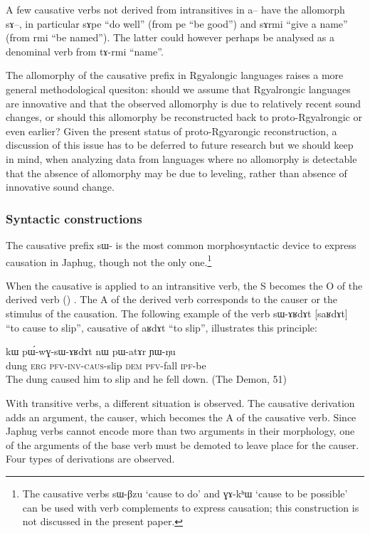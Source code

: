 \documentclass[oldfontcommands,oneside,a4paper,11pt]{article}
\newcommand{\ipa}[1]{{\phon \mbox{#1}}} %
\newcommand{\pfv}{\textsc{pfv}}
\newcommand{\caus}{\textsc{caus}}
\newcommand{\dem}{\textsc{dem}}
\newcommand{\erg}{\textsc{erg}}
\newcommand{\inv}{\textsc{inv}}
\newcommand{\ipf}{\textsc{ipf}}
\begin{document}
A few causative verbs not derived from intransitives in \ipa{a}-- have the allomorph \ipa{sɤ}--, in particular \ipa{sɤpe} ``do well'' (from \ipa{pe} ``be good'') and \ipa{sɤrmi} ``give a name'' (from \ipa{rmi} ``be named''). The latter could however perhaps be analysed as a denominal verb from \ipa{tɤ-rmi} ``name''.

The allomorphy of the causative prefix in Rgyalongic languages raises a more general methodological quesiton: should we assume that Rgyalrongic languages are innovative and that the observed allomorphy is due to relatively recent sound changes, or should this allomorphy be reconstructed back to proto-Rgyalrongic or even earlier? Given the present status of proto-Rgyarongic reconstruction, a discussion of this issue has to be deferred to future research but we should keep in mind, when analyzing data from languages where no allomorphy is detectable that the absence of allomorphy may be due to leveling, rather than absence of innovative sound change.

\subsubsection{Syntactic constructions} \label{subsub:causation}
The causative prefix \ipa{sɯ-} is the most common morphosyntactic device to express causation in Japhug, though not the only one.\footnote{The causative verbs \ipa{sɯ-βzu} `cause to do' and \ipa{ɣɤ-kʰɯ} `cause to be possible' can be used with verb complements to express causation; this construction is not discussed in the present paper. }

When the causative is applied to an intransitive verb, the S becomes the O of the derived verb (\citealt[45]{dixon00causative}) . The A of the derived verb corresponds to the causer  or the stimulus of the causation.  The following example of the verb \ipa{sɯ-ɤʁdɤt} [\ipa{saʁdɤt}] ``to cause to slip'', causative of \ipa{aʁdɤt} ``to slip'', illustrates this principle:
\begin{exe}
\ex
\gll \ipa{tɯqe} 	\ipa{kɯ} 	\ipa{pɯ́-wɣ-sɯ-ɤʁdɤt} 	\ipa{nɯ} 	\ipa{pɯ-atɤr} 	\ipa{ɲɯ-ŋu} \\
dung \erg{} \pfv{}-\inv{}-\caus{}-slip \dem{} \pfv{}-fall \ipf{}-be \\
 \glt The dung caused him to slip and he fell down. (The Demon, 51)
\end{exe} 


With transitive verbs, a different situation is observed. The causative derivation adds an argument, the causer, which becomes the A of the causative verb. Since Japhug verbs cannot encode more than two arguments in their morphology, one of the arguments of the base verb must be demoted to leave place for the causer.  Four types of derivations are observed.
\end{document}
